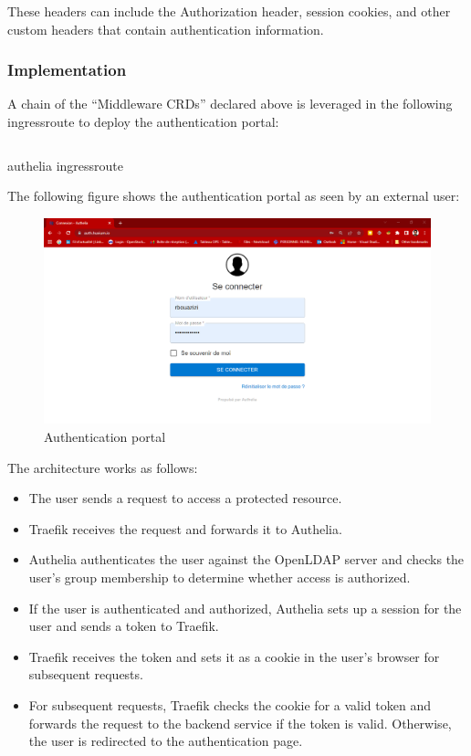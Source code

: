 These headers can include the Authorization header, session cookies, and other custom headers that contain authentication information. 

\subsubsection{Implementation }


A chain of the “Middleware CRDs” declared above is leveraged in the following  ingressroute to deploy the authentication portal: 

\begin{listing}[H]
\inputminted{Yaml}{codeListing/authelia_ingressroute.yml}
\caption{authelia ingressroute}
\label{lst:authelia ingressroute}
\end{listing}

The following figure shows the authentication portal as seen by an external user: 
\begin{figure}[H]\centering
\includegraphics[width=1.0\textwidth,angle=00]{assets/f55.png}
\caption{Authentication portal}
\label{fig:f55}
\end{figure}


The architecture works as follows: 
\begin{itemize}[label={--}]
\item The user sends a request to access a protected resource. 
\item  Traefik receives the request and forwards it to Authelia. 
\item  Authelia authenticates the user against the OpenLDAP server and checks the user's group membership to determine whether access is authorized. 
\item  If the user is authenticated and authorized, Authelia sets up a session for the user and sends a token to Traefik. 
\item  Traefik receives the token and sets it as a cookie in the user's browser for subsequent requests. 
\item  For subsequent requests, Traefik checks the cookie for a valid token and forwards the request to the backend service if the token is valid. Otherwise, the user is redirected to the authentication page.  
\end{itemize}